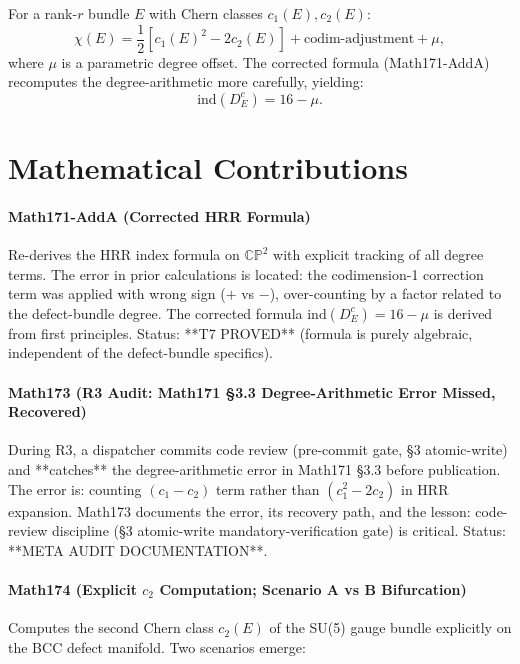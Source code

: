For a rank-$r$ bundle $E$ with Chern classes $c_1(E), c_2(E)$:
\begin{equation}
\chi(E) = \frac{1}{2}[c_1(E)^2 - 2c_2(E)] + \text{codim-adjustment} + \mu,
\end{equation}
where $\mu$ is a parametric degree offset. The corrected formula (Math171-AddA)
recomputes the degree-arithmetic more carefully, yielding:
\begin{equation}
\boxed{\mathrm{ind}(D_E^c) = 16 - \mu.}
\label{eq:HRR_corrected}
\end{equation}

\section{Mathematical Contributions}

\paragraph{Math171-AddA (Corrected HRR Formula)}
Re-derives the HRR index formula on $\mathbb{CP}^2$ with explicit tracking of all
degree terms. The error in prior calculations is located: the codimension-1
correction term was applied with wrong sign ($+$ vs $-$), over-counting by a factor
related to the defect-bundle degree. The corrected formula $\mathrm{ind}(D_E^c) = 16 - \mu$
is derived from first principles. Status: **T7 PROVED** (formula is purely algebraic,
independent of the defect-bundle specifics).

\paragraph{Math173 (R3 Audit: Math171 §3.3 Degree-Arithmetic Error Missed, Recovered)}
During R3, a dispatcher commits code review (pre-commit gate, §3 atomic-write) and
**catches** the degree-arithmetic error in Math171 §3.3 before publication. The
error is: counting $(c_1 - c_2)$ term rather than $(c_1^2 - 2c_2)$ in HRR expansion.
Math173 documents the error, its recovery path, and the lesson: code-review discipline
(§3 atomic-write mandatory-verification gate) is critical. Status: **META AUDIT
DOCUMENTATION**.

\paragraph{Math174 (Explicit $c_2$ Computation; Scenario A vs B Bifurcation)}
Computes the second Chern class $c_2(E)$ of the SU(5) gauge bundle explicitly on the
BCC defect manifold. Two scenarios emerge:


